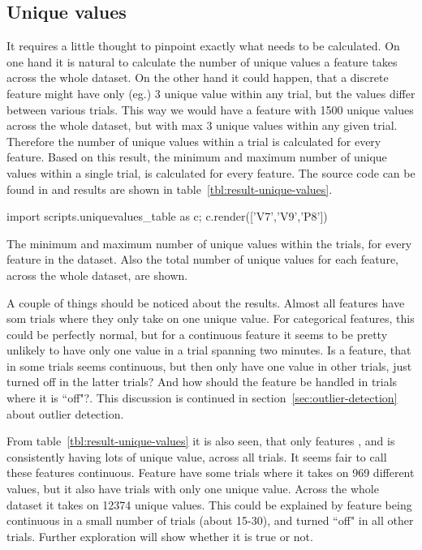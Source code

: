 \subsection{Unique values}\label{sec:unique-values}
It requires a little thought to pinpoint exactly what needs to be calculated. On one hand it is natural to calculate the number of unique values a feature takes across the whole dataset. On the other hand it could happen, that a discrete feature might have only (eg.) 3 unique value within any trial, but the values differ between various trials. This way we would have a feature with 1500 unique values across the whole dataset, but with max 3 unique values within any given trial. Therefore the number of unique values within a trial is calculated for every feature. Based on this result, the minimum and maximum number of unique values within a single trial, is calculated for every feature. The source code can be found in  and results are shown in table~\ref{tbl:result-unique-values}.\par
\begin{table}
    {\small\sffamily
        \begin{python}
            import scripts.uniquevalues_table as c; c.render(['V7','V9','P8'])
        \end{python}
    }
    \caption{The minimum and maximum number of unique values within the trials, for every feature in the dataset. Also the total number of unique values for each feature, across the whole dataset, are shown.}
    \label{tbl:result-unique-values}
\end{table}
A couple of things should be noticed about the results. Almost all features have som trials where they only take on one unique value. For categorical features, this could be perfectly normal, but for a continuous feature it seems to be pretty unlikely to have only one value in a trial spanning two minutes. Is a feature, that in some trials seems continuous, but then only have one value in other trials, just turned off in the latter trials? And how should the feature be handled in trials where it is ``off"?. This discussion is continued in section~\ref{sec:outlier-detection} about outlier detection. \par

From table~\ref{tbl:result-unique-values} it is also seen, that only features ,  and  is consistently having lots of unique value, across all trials. It seems fair to call these features continuous. Feature  have some trials where it takes on 969 different values, but it also have trials with only one unique value. Across the whole dataset it takes on 12374 unique values. This could be explained by feature  being continuous in a small number of trials (about 15-30), and turned ``off" in all other trials. Further exploration will show whether it is true or not. \par

